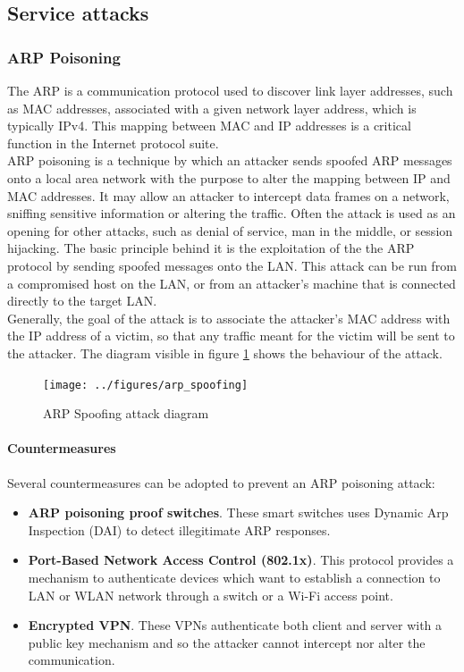 \documentclass[final]{article}
\begin{document}
\subsection{Service attacks}
\subsubsection{ARP Poisoning}
The \ac{ARP} is a communication protocol used to discover link layer addresses,
such as MAC addresses, associated with a given network layer address, which is typically IPv4.
This mapping between MAC and IP addresses is a critical function in the Internet protocol suite. \\
\ac{ARP} poisoning is a technique by which an attacker sends spoofed \ac{ARP} messages
onto a local area network with the purpose to alter the mapping between IP and MAC addresses.
It may allow an attacker to intercept data frames on a network, sniffing sensitive information or altering the traffic.
Often the attack is used as an opening for other attacks,
such as denial of service, man in the middle, or session hijacking.
The basic principle behind it is the exploitation of the the
\ac{ARP} protocol by sending spoofed messages onto the LAN.
This attack can be run from a compromised host on the LAN,
or from an attacker's machine that is connected directly to the target LAN.\\
Generally, the goal of the attack is to associate the attacker's MAC address
with the IP address of a victim, so that any traffic meant for the victim
will be sent to the attacker.
The diagram visible in figure \ref{arp_spoofing} shows the behaviour of the attack.
\begin{figure}
  \center
  \texttt{[image: ../figures/arp\_spoofing]}
  \caption{ARP Spoofing attack diagram}
  \label{arp_spoofing}
\end{figure}

\paragraph{Countermeasures}
Several countermeasures can be adopted to prevent an \ac{ARP} poisoning attack:
\begin{itemize}
  \item \textbf{\ac{ARP} poisoning proof switches}. These smart switches uses Dynamic Arp Inspection (DAI) to detect illegitimate ARP responses. \cite{7345444}
  \item \textbf{Port-Based Network Access Control (802.1x)}. This protocol provides a mechanism to authenticate devices which want to establish a connection to LAN or WLAN network through a switch or a Wi-Fi access point. \cite{Qinggui_Hu}
  \item \textbf{Encrypted VPN}. These VPNs authenticate both client and server with a public key mechanism and so the attacker cannot intercept nor alter the communication.
\end{itemize}
\end{document}
